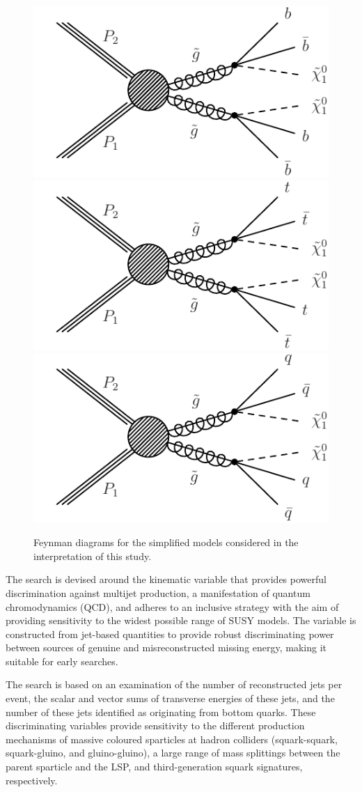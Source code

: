 \begin{figure}[thb]
\centering
\includegraphics[width=0.32\linewidth]{T1bbbb.pdf}
\includegraphics[width=0.32\linewidth]{T1tttt.pdf}
\includegraphics[width=0.32\linewidth]{T1qqqq.pdf}
\caption{
Feynman diagrams for the simplified models considered in the interpretation of this study.
}
\label{fig:feyn}
\end{figure}

The search is devised around the kinematic variable \alphat that
provides powerful discrimination against multijet production, a
manifestation of quantum chromodynamics (QCD), and adheres to an
inclusive strategy with the aim of providing sensitivity to the widest
possible range of SUSY models. The \alphat variable is constructed from jet-based quantities to provide robust discriminating power between sources of genuine and misreconstructed missing energy, making it suitable for early searches.

The search is based on an examination
of the number of reconstructed jets per event, the scalar and vector sums of
transverse energies of these jets, and the number of these jets
identified as originating from bottom quarks. These
discriminating variables provide sensitivity to the different
production mechanisms of massive coloured sparticles at hadron
colliders (\ie squark-squark, squark-gluino, and gluino-gluino), a
large range of mass splittings between the parent sparticle and the
LSP, and third-generation squark signatures, respectively.

